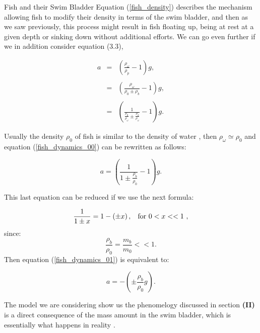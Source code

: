 \begin{section}{Fish and their Swim Bladder}
    Equation (\ref{fish_density}) describes the mechanism allowing fish to modify their density in
    terms of the swim bladder, and then as we saw previously, this process might result in fish 
    floating up, being at rest at a given depth or sinking down without additional efforts. We can go 
    even further if we in addition consider equation (3.3),
    
    \begin{eqnarray}
        a &=& \left( \frac{\rho_{\omega}}{\rho_p} -1 \right)g,
        \nonumber\\
        {}&{}&{}
        \nonumber \\
        &=& \left( \frac{\rho_{\omega}}{\rho_0 \pm \rho_b} -1 \right)g,
        \nonumber\\
        {}&{}&{}
        \nonumber \\
        \label{fish_dynamics_00}
        &=& \left( \frac{1}{\frac{\rho_0}{\rho_{\omega}} \pm \frac{\rho_b}{\rho_{\omega}}} -1 \right)g.
    \end{eqnarray}
    
    Usually the density $\rho_0$ of fish is similar to the density of water \cite{QUENTIN}, then
    $\rho_{\omega} \simeq \rho_0$ and equation (\ref{fish_dynamics_00}) can be rewritten as follows:
    
    \begin{equation}
        \label{fish_dynamics_01}
        a = \left( \frac{1}{ 1 \pm \frac{\rho_b}{\rho_0}} - 1 \right)g.
    \end{equation}
    
    This last equation can be reduced if we use the next formula:
    
    \begin{equation}
        \label{formula}
        \frac{1}{1 \pm x} = 1 - \left(\pm x\right), \hspace{3mm} \text{for  $0<x<<1$ },
    \end{equation}
    since: $$\frac{\rho_b}{\rho_0} = \frac{m_b}{m_0} << 1. $$ Then equation (\ref{fish_dynamics_01})
    is equivalent to:
    
    \begin{equation}
        \label{fish_dynamics_02}
        a = - \left(\pm \frac{\rho_b}{\rho_0} g \right).
    \end{equation}
    
    The model we are considering show us the phenomelogy discussed in section \textbf{(II)} is a direct
    consequence of the mass amount in the swim bladder, which is essentially what happens in reality
    \cite{QUENTIN}.
    
\end{section}
